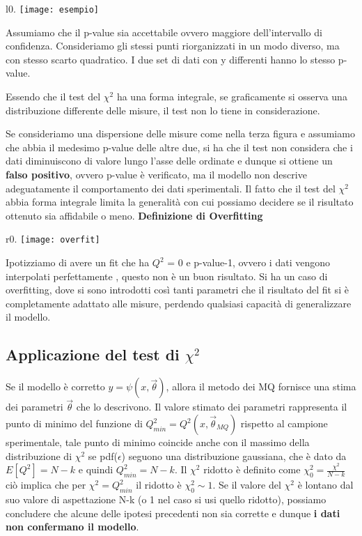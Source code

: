 \documentclass[11pt,a4paper]{book}
\begin{document}
\begin{wrapfigure}[18]{l}{0.\textwidth}
\centering
\texttt{[image: esempio]}	
\end{wrapfigure}

Assumiamo che il p-value sia accettabile ovvero maggiore
dell'intervallo di confidenza. Consideriamo gli stessi punti 
riorganizzati in un modo diverso, ma con stesso scarto quadratico.
I due set di dati con y differenti hanno lo stesso p-value.

Essendo che il test del $\chi^2$ ha una forma integrale, se
graficamente si osserva una distribuzione differente delle
misure, il test non lo tiene in considerazione.

Se consideriamo una dispersione delle misure come nella terza figura e
assumiamo che abbia il medesimo p-value delle altre due, si ha
che il test non considera che i dati diminuiscono di valore lungo l'asse delle ordinate e dunque si ottiene un \textbf{falso positivo}, ovvero p-value \`{e} verificato, ma il modello non descrive adeguatamente il comportamento dei dati sperimentali.
Il fatto che il test del $\chi^2$ abbia forma integrale limita la generalit\`{a} con cui possiamo decidere se il risultato ottenuto sia affidabile o meno.
\newline
\newline
\textbf{Definizione di Overfitting}

\begin{wrapfigure}{r}{0.\textwidth}
\centering
\texttt{[image: overfit]}	
\end{wrapfigure}
\vspace{0.05in}

\noindent Ipotizziamo di avere un fit che ha $Q^2$ = 0 e p-value-1,
ovvero i dati vengono interpolati perfettamente , questo non è
un buon risultato. Si ha un caso di overfitting, dove si sono introdotti così tanti parametri che
il risultato del fit si \`{e} completamente adattato alle misure, perdendo qualsiasi
capacit\`{a} di generalizzare il modello. 

\subsection{Applicazione del test di $\chi^2$}

Se il modello \`{e} corretto $y = \psi(x,\vec{\theta})$, allora il metodo dei MQ fornisce una stima dei parametri $\vec{\theta}$ che lo descrivono. Il valore stimato dei parametri rappresenta il punto di minimo del funzione di $Q^2_{min} = Q^2(x,\vec{\theta}_{MQ})$ rispetto al campione sperimentale, tale punto di minimo coincide anche con il massimo della distribuzione di $\chi^2$ se pdf($\epsilon$) seguono una distribuzione gaussiana, che \`{e} dato da $E[Q^2] = N-k$ e quindi $Q^2_{min} = N-k$. \newline
Il $\chi^2$ ridotto \`{e} definito come $\chi^2_{0} = \frac{\chi^2}{N-k}$ ci\`{o} implica che per $\chi^2 = Q^2_{min}$ il ridotto \`{e} $\chi^2_0 \sim 1$. \newline
Se il valore del $\chi^2$ \`{e} lontano dal suo valore di aspettazione N-k (o 1 nel caso si usi quello ridotto), possiamo concludere che alcune delle ipotesi precedenti non sia corrette e dunque \textbf{i dati non confermano il modello}. 
\end{document}
